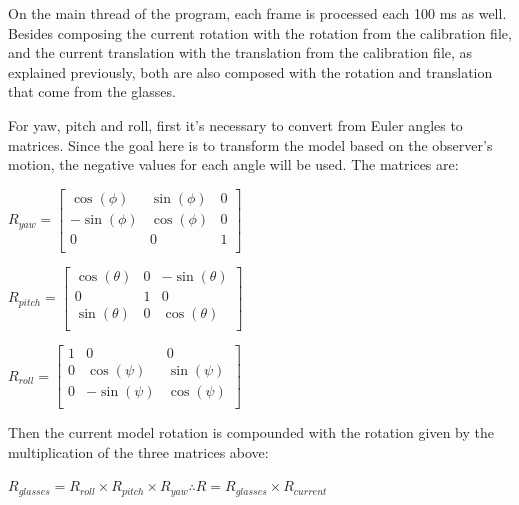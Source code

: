 \documentclass[msc, a4paper, classic, en]{ufbathesis}
\begin{document}
On the main thread of the program, each frame is processed each 100 ms as well. Besides composing the current rotation with the rotation from the calibration file, and the current translation with the translation from the calibration file, as explained previously, both are also composed with the rotation and translation that come from the glasses.

For yaw, pitch and roll, first it's necessary to convert from Euler angles to matrices. Since the goal here is to transform the model based on the observer's motion, the negative values for each angle will be used. The matrices are:

\begin{center}
$R_{yaw} = \begin{bmatrix}
           \cos(\phi) & \sin(\phi) & 0 \\
           -\sin(\phi) & \cos(\phi) & 0 \\
           0 & 0 & 1 \\
           \end{bmatrix}$
\end{center}

\begin{center}
$R_{pitch} = \begin{bmatrix}
             \cos(\theta) & 0 & -\sin(\theta) \\
             0 & 1 & 0 \\
             \sin(\theta) & 0 & \cos(\theta) \\
             \end{bmatrix}$
\end{center}

\begin{center}
$R_{roll} = \begin{bmatrix}
            1 & 0 & 0 \\
            0 & \cos(\psi) & \sin(\psi) \\
            0 & -\sin(\psi) & \cos(\psi) \\
            \end{bmatrix}$
\end{center}

Then the current model rotation is compounded with the rotation given by the multiplication of the three matrices above:

\begin{center}
$R_{glasses} = R_{roll} \times R_{pitch} \times R_{yaw} \therefore R =  R_{glasses} \times R_{current}$
\end{center}
\end{document}
